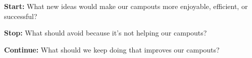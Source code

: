 \documentclass[letterpaper]{exam}
\begin{document}




\vspace{5mm}
\begin{questions}

\question \textbf{Start:} What new ideas would make our campouts more enjoyable, efficient, or successful?

\question \textbf{Stop:} What should avoid because it's not helping our campouts?

\question \textbf{Continue:} What should we keep doing that improves our campouts?

\end{questions}
\end{document}
